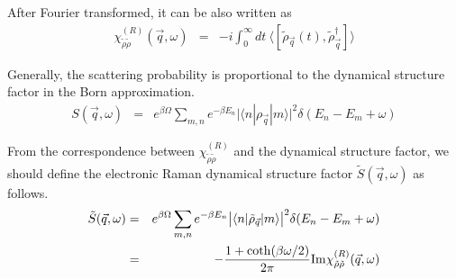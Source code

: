 \documentclass[uplatex,a4j,12pt,dvipdfmx]{jsarticle}
\begin{document}
After Fourier transformed, it can be also written as
\begin{eqnarray}
	\chi^{(R)}_{\tilde{\rho} \tilde{\rho}}(\vec{q},\omega)
	&=&
	- i \int^{\infty}_{0} \!\! dt \
	\big\langle [ \tilde{\rho}_{\vec{q}}(t) , \tilde{\rho}_{\vec{q}}^{\dagger} ] \big\rangle
\end{eqnarray}


Generally, the scattering probability is proportional to the dynamical structure factor in the Born approximation.
\begin{eqnarray}
	S(\vec{q},\omega)
	&=&
	e^{\beta \Omega}
	\sum_{m,n} e^{- \beta E_{n}}
	\big| \langle n | \rho_{\vec{q}} | m \rangle \big|^{2} \delta (E_{n} - E_{m} + \omega)
\end{eqnarray}


From the correspondence between $\chi^{(R)}_{\tilde{\rho} \tilde{\rho}}$ and the dynamical structure factor,
we should define the electronic Raman dynamical structure factor $\tilde{S}(\vec{q},\omega)$ as follows.
\begin{eqnarray}
	\tilde{S} (\vec{q},\omega)
	&=&
	e^{\beta \Omega}
	\sum_{m,n} e^{- \beta E_{n}}
	\big| \langle n | \tilde{\rho}_{\vec{q}} | m \rangle \big|^{2} \delta (E_{n} - E_{m} + \omega)
	\nonumber \\ &=&
	- \dfrac{1 + {\rm coth} (\beta \omega/2) }{2 \pi}
	{\rm Im} \chi^{(R)}_{\tilde{\rho} \tilde{\rho}} (\vec{q},\omega)
\end{eqnarray}
\end{document}
